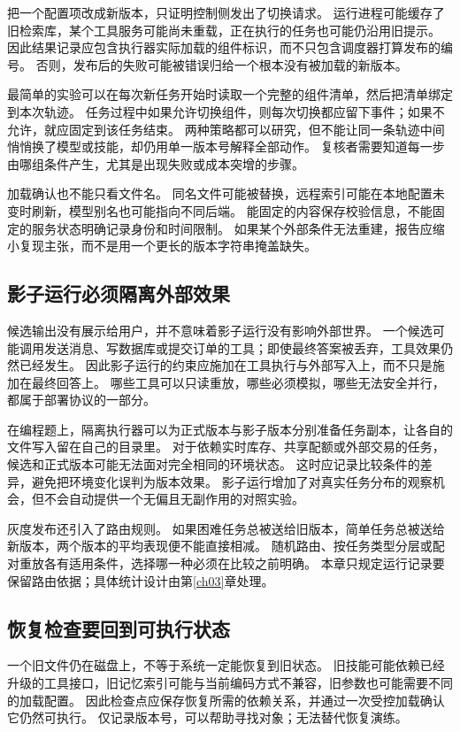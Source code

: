 把一个配置项改成新版本，只证明控制侧发出了切换请求。
运行进程可能缓存了旧检索库，某个工具服务可能尚未重载，正在执行的任务也可能仍沿用旧提示。
因此结果记录应包含执行器实际加载的组件标识，而不只包含调度器打算发布的编号。
否则，发布后的失败可能被错误归给一个根本没有被加载的新版本。

最简单的实验可以在每次新任务开始时读取一个完整的组件清单，然后把清单绑定到本次轨迹。
任务过程中如果允许切换组件，则每次切换都应留下事件；如果不允许，就应固定到该任务结束。
两种策略都可以研究，但不能让同一条轨迹中间悄悄换了模型或技能，却仍用单一版本号解释全部动作。
复核者需要知道每一步由哪组条件产生，尤其是出现失败或成本突增的步骤。

加载确认也不能只看文件名。
同名文件可能被替换，远程索引可能在本地配置未变时刷新，模型别名也可能指向不同后端。
能固定的内容保存校验信息，不能固定的服务状态明确记录身份和时间限制。
如果某个外部条件无法重建，报告应缩小复现主张，而不是用一个更长的版本字符串掩盖缺失。

\subsection{影子运行必须隔离外部效果}

候选输出没有展示给用户，并不意味着影子运行没有影响外部世界。
一个候选可能调用发送消息、写数据库或提交订单的工具；即使最终答案被丢弃，工具效果仍然已经发生。
因此影子运行的约束应施加在工具执行与外部写入上，而不只是施加在最终回答上。
哪些工具可以只读重放，哪些必须模拟，哪些无法安全并行，都属于部署协议的一部分。

在编程题上，隔离执行器可以为正式版本与影子版本分别准备任务副本，让各自的文件写入留在自己的目录里。
对于依赖实时库存、共享配额或外部交易的任务，候选和正式版本可能无法面对完全相同的环境状态。
这时应记录比较条件的差异，避免把环境变化误判为版本效果。
影子运行增加了对真实任务分布的观察机会，但不会自动提供一个无偏且无副作用的对照实验。

灰度发布还引入了路由规则。
如果困难任务总被送给旧版本，简单任务总被送给新版本，两个版本的平均表现便不能直接相减。
随机路由、按任务类型分层或配对重放各有适用条件，选择哪一种必须在比较之前明确。
本章只规定运行记录要保留路由依据；具体统计设计由第\ref{ch03}章处理。

\subsection{恢复检查要回到可执行状态}

一个旧文件仍在磁盘上，不等于系统一定能恢复到旧状态。
旧技能可能依赖已经升级的工具接口，旧记忆索引可能与当前编码方式不兼容，旧参数也可能需要不同的加载配置。
因此检查点应保存恢复所需的依赖关系，并通过一次受控加载确认它仍然可执行。
仅记录版本号，可以帮助寻找对象；无法替代恢复演练。

